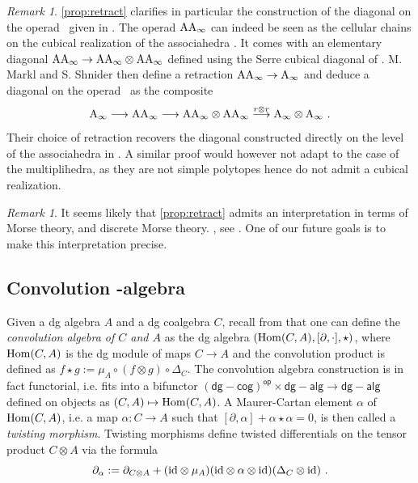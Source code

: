 \documentclass[twoside, 12pt]{amsart}
\theoremstyle{remark}
\newtheorem{remark}[definition]{\sc Remark}
\begin{document}
\begin{remark}
\cref{prop:retract} clarifies in particular the construction of the diagonal on the operad \Ainf\ given in \cite{MarklShnider06}. 
The operad $\mathrm{AA}_\infty$ can indeed be seen as the cellular chains on the cubical realization of the associahedra \cite[Section 9.3.1]{LodayVallette12}. 
It comes with an elementary diagonal $\mathrm{AA}_\infty \rightarrow \mathrm{AA}_\infty \otimes \mathrm{AA}_\infty$ defined using the Serre cubical diagonal of \cite{Serre51}.
M. Markl and S. Shnider then define a retraction $\mathrm{AA}_\infty \rightarrow \mathrm{A}_\infty$ and deduce a diagonal on the operad \Ainf\ as the composite
\[ \mathrm{A}_\infty \longrightarrow \mathrm{AA}_\infty \longrightarrow \mathrm{AA}_\infty \otimes \mathrm{AA}_\infty \overset{r \otimes r}{\longrightarrow} \mathrm{A}_\infty \otimes \mathrm{A}_\infty \ . \]
Their choice of retraction recovers the diagonal constructed directly on the level of the associahedra in \cite[Theorem 2]{MTTV19}.
A similar proof would however not adapt to the case of the multiplihedra, as they are not simple polytopes hence do not admit a cubical realization.
\end{remark}

\begin{remark}
  It seems likely that \cref{prop:retract} admits an interpretation in terms of Morse theory, and discrete Morse theory. , see \cite[Remark 1.6]{LA21}.
  One of our future goals is to make this interpretation precise. 
\end{remark}

\subsection{Convolution \Ainf -algebra} \label{ss:conv-ainf-alg}

Given a dg algebra $A$ and a dg coalgebra $C$, recall from  \cite[Section 1.6]{LodayVallette12} that one can define the \textit{convolution algebra of $C$ and $A$} as the dg algebra $(\mathrm{Hom} (C,A) , [ \partial , \cdot ] , \star)$, where $\mathrm{Hom} (C,A)$
is the dg module of maps $C \rightarrow A$ and the convolution product is defined as $f \star g := \mu_A \circ ( f \otimes g) \circ \Delta_C$. The convolution algebra construction is in fact functorial, i.e. fits into a bifunctor $\mathsf{(dg-cog)^{op}} \times \mathsf{dg-alg} \rightarrow \mathsf{dg-alg}$ defined on objects as $(C,A) \mapsto \mathrm{Hom} (C,A)$.
A Maurer-Cartan element $\alpha$ of $\mathrm{Hom} (C,A)$, i.e. a map $\alpha : C \rightarrow A$ such that 
$[ \partial , \alpha ] + \alpha \star \alpha  = 0$,
is then called a \emph{twisting morphism}. 
Twisting morphisms define twisted differentials on the tensor product $C \otimes A$ via the formula
\[ \partial_\alpha := \partial_{C \otimes A} + (\mathrm{id} \otimes \mu_A ) ( \mathrm{id} \otimes \alpha \otimes \mathrm{id} ) ( \Delta_C \otimes \mathrm{id} ) \ . \]
\end{document}
